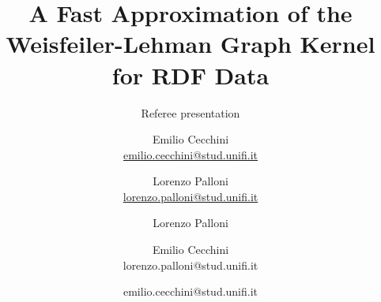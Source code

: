\documentclass{beamer}
\title{A Fast Approximation of the Weisfeiler-Lehman Graph Kernel for RDF Data}
\subtitle{Referee presentation}
\author{
	Emilio Cecchini \\ \href{mailto:emilio.cecchini@stud.unifi.it}{emilio.cecchini@stud.unifi.it}
	\and
	Lorenzo Palloni \\ \href{mailto:lorenzo.palloni@stud.unifi.it}{lorenzo.palloni@stud.unifi.it}
}
\author{Lorenzo Palloni \and Emilio Cecchini \\ lorenzo.palloni@stud.unifi.it \and emilio.cecchini@stud.unifi.it}
\begin{document}
	\begin{frame}
		\titlepage
	\end{frame}
\end{document}
